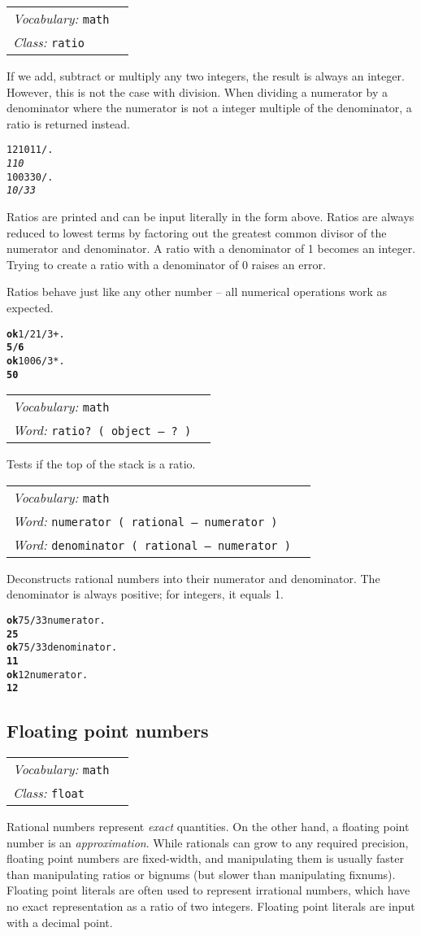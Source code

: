 \documentclass{book}
\newcommand{\vocabulary}[1]{\emph{Vocabulary:} \texttt{#1}&\\}
\newcommand{\ordinaryword}[2]{\index{\texttt{#1}}\emph{Word:} \texttt{#2}&\\}
\newcommand{\classword}[1]{\index{\texttt{#1}}\emph{Class:} \texttt{#1}&\\}
\newcommand{\predword}[1]{\ordinaryword{#1}{#1~( object -- ?~)}}
\newcommand{\wordtable}[1]{

\begin{tabularx}{12cm}[t]{lX}
\hline
#1
\hline
\end{tabularx}

}
\begin{document}
\newcommand{\rationalglos}{}
\rationalglos
\ratioglos

\wordtable{
\vocabulary{math}
\classword{ratio}
}
If we add, subtract or multiply any two integers, the result is always an integer. However, this is not the case with division. When dividing a numerator by a denominator where the numerator is not a integer multiple of the denominator, a ratio is returned instead.
\begin{alltt}
1210 11 / .
\emph{110}
100 330 / .
\emph{10/33}
\end{alltt}
Ratios are printed and can be input literally in the form above. Ratios are always reduced to lowest terms by factoring out the greatest common divisor of the numerator and denominator. A ratio with a denominator of 1 becomes an integer. Trying to create a ratio with a denominator of 0 raises an error.

Ratios behave just like any other number -- all numerical operations work as expected.
\begin{alltt}
\textbf{ok} 1/2 1/3 + .
\textbf{5/6}
\textbf{ok} 100 6 / 3 * .
\textbf{50}
\end{alltt}
\wordtable{
\vocabulary{math}
\predword{ratio?}
}
Tests if the top of the stack is a ratio.
\wordtable{
\vocabulary{math}
\ordinaryword{numerator}{numerator ( rational -- numerator )}
\ordinaryword{denominator}{denominator ( rational -- numerator )}
}
Deconstructs rational numbers into their numerator and denominator. The denominator is always positive; for integers, it equals 1.
\begin{alltt}
\textbf{ok} 75/33 numerator .
\textbf{25}
\textbf{ok} 75/33 denominator .
\textbf{11}
\textbf{ok} 12 numerator .
\textbf{12}
\end{alltt}

\subsection{\label{floats}Floating point numbers}

\wordtable{
\vocabulary{math}
\classword{float}
}
\newcommand{\realglos}{}
\realglos
\floatglos

Rational numbers represent \emph{exact} quantities. On the other hand, a floating point number is an \emph{approximation}. While rationals can grow to any required precision, floating point numbers are fixed-width, and manipulating them is usually faster than manipulating ratios or bignums (but slower than manipulating fixnums). Floating point literals are often used to represent irrational numbers, which have no exact representation as a ratio of two integers. Floating point literals are input with a decimal point.
\end{document}
